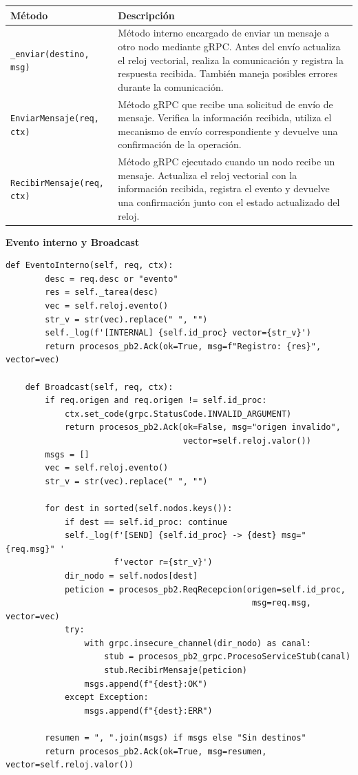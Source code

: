 \documentclass[letterpaper,11pt]{article}
\begin{document}
\begin{center}
\begin{tabular}{>{\ttfamily}l p{9cm}}
\toprule
\textbf{Método} & \textbf{Descripción} \\
\midrule
\texttt{\_enviar(destino, msg)} &
  Método interno encargado de enviar un mensaje a otro nodo mediante gRPC.
  Antes del envío actualiza el reloj vectorial, realiza la comunicación y
  registra la respuesta recibida. También maneja posibles errores durante
  la comunicación. \\[4pt]

\texttt{EnviarMensaje(req, ctx)} &
  Método gRPC que recibe una solicitud de envío de mensaje. Verifica la
  información recibida, utiliza el mecanismo de envío correspondiente y
  devuelve una confirmación de la operación. \\[4pt]

\texttt{RecibirMensaje(req, ctx)} &
  Método gRPC ejecutado cuando un nodo recibe un mensaje. Actualiza el
  reloj vectorial con la información recibida, registra el evento y
  devuelve una confirmación junto con el estado actualizado del reloj. \\
\bottomrule
\end{tabular}
\end{center}

\textbf{Evento interno y Broadcast}

\begin{lstlisting}[style=python, caption={process.py — Evento interno y Broadcast}]
    def EventoInterno(self, req, ctx):
        desc = req.desc or "evento"
        res = self._tarea(desc)
        vec = self.reloj.evento()
        str_v = str(vec).replace(" ", "")
        self._log(f'[INTERNAL] {self.id_proc} vector={str_v}')
        return procesos_pb2.Ack(ok=True, msg=f"Registro: {res}", vector=vec)
 
    def Broadcast(self, req, ctx):
        if req.origen and req.origen != self.id_proc:
            ctx.set_code(grpc.StatusCode.INVALID_ARGUMENT)
            return procesos_pb2.Ack(ok=False, msg="origen invalido",
                                    vector=self.reloj.valor())
        msgs = []
        vec = self.reloj.evento()
        str_v = str(vec).replace(" ", "")
 
        for dest in sorted(self.nodos.keys()):
            if dest == self.id_proc: continue
            self._log(f'[SEND] {self.id_proc} -> {dest} msg="{req.msg}" '
                      f'vector r={str_v}')
            dir_nodo = self.nodos[dest]
            peticion = procesos_pb2.ReqRecepcion(origen=self.id_proc,
                                                  msg=req.msg, vector=vec)
            try:
                with grpc.insecure_channel(dir_nodo) as canal:
                    stub = procesos_pb2_grpc.ProcesoServiceStub(canal)
                    stub.RecibirMensaje(peticion)
                msgs.append(f"{dest}:OK")
            except Exception:
                msgs.append(f"{dest}:ERR")
 
        resumen = ", ".join(msgs) if msgs else "Sin destinos"
        return procesos_pb2.Ack(ok=True, msg=resumen, vector=self.reloj.valor())
\end{lstlisting}
\end{document}
